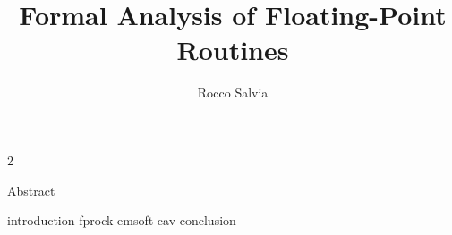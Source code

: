 \documentclass[11pt,Chicago]{uuthesis2e}
\author                 {Rocco Salvia}
\title                  {Formal Analysis of Floating-Point Routines}
\begin{document}
\frontmatterformat
\titlepage
\copyrightpage
\dissertationapproval
\setcounter {page}     {2}             %

 {Abstract}
\tableofcontents
\listoffigures
\listoftables





\maintext       %

\pagestyle{plain}
\pagestyle{headings}

 {introduction}
 {fprock}
 {emsoft}
 {cav}
 {conclusion}

\newpage

\end{document}
